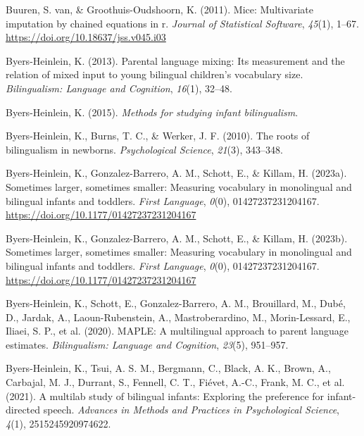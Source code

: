 \documentclass[
  12pt,
  b5paperpaper,
  twoside]{scrreprt}
\newlength{\cslhangindent}
\newlength{\cslentryspacingunit} %
\newenvironment{CSLReferences}[2] %
 {%
  \setlength{\parindent}{0pt}
  \ifodd #1
  \let\oldpar\par
  \def\par{\hangindent=\cslhangindent\oldpar}
  \fi
  \setlength{\parskip}{#2\cslentryspacingunit}
 }%
 {}
\begin{document}
\begin{CSLReferences}{1}{0}
\leavevmode{}%
Buuren, S. van, \& Groothuis-Oudshoorn, K. (2011). Mice: Multivariate
imputation by chained equations in r. \emph{Journal of Statistical
Software}, \emph{45}(1), 1--67.
\url{https://doi.org/10.18637/jss.v045.i03}

\leavevmode{}%
Byers-Heinlein, K. (2013). Parental language mixing: Its measurement and
the relation of mixed input to young bilingual children's vocabulary
size. \emph{Bilingualism: Language and Cognition}, \emph{16}(1), 32--48.

\leavevmode{}%
Byers-Heinlein, K. (2015). \emph{Methods for studying infant
bilingualism}.

\leavevmode{}%
Byers-Heinlein, K., Burns, T. C., \& Werker, J. F. (2010). The roots of
bilingualism in newborns. \emph{Psychological Science}, \emph{21}(3),
343--348.

\leavevmode{}%
Byers-Heinlein, K., Gonzalez-Barrero, A. M., Schott, E., \& Killam, H.
(2023a). Sometimes larger, sometimes smaller: Measuring vocabulary in
monolingual and bilingual infants and toddlers. \emph{First Language},
\emph{0}(0), 01427237231204167.
\url{https://doi.org/10.1177/01427237231204167}

\leavevmode{}%
Byers-Heinlein, K., Gonzalez-Barrero, A. M., Schott, E., \& Killam, H.
(2023b). Sometimes larger, sometimes smaller: Measuring vocabulary in
monolingual and bilingual infants and toddlers. \emph{First Language},
\emph{0}(0), 01427237231204167.
\url{https://doi.org/10.1177/01427237231204167}

\leavevmode{}%
Byers-Heinlein, K., Schott, E., Gonzalez-Barrero, A. M., Brouillard, M.,
Dubé, D., Jardak, A., Laoun-Rubenstein, A., Mastroberardino, M.,
Morin-Lessard, E., Iliaei, S. P., et al. (2020). MAPLE: A multilingual
approach to parent language estimates. \emph{Bilingualism: Language and
Cognition}, \emph{23}(5), 951--957.

\leavevmode{}%
Byers-Heinlein, K., Tsui, A. S. M., Bergmann, C., Black, A. K., Brown,
A., Carbajal, M. J., Durrant, S., Fennell, C. T., Fiévet, A.-C., Frank,
M. C., et al. (2021). A multilab study of bilingual infants: Exploring
the preference for infant-directed speech. \emph{Advances in Methods and
Practices in Psychological Science}, \emph{4}(1), 2515245920974622.


\end{CSLReferences}
\end{document}
